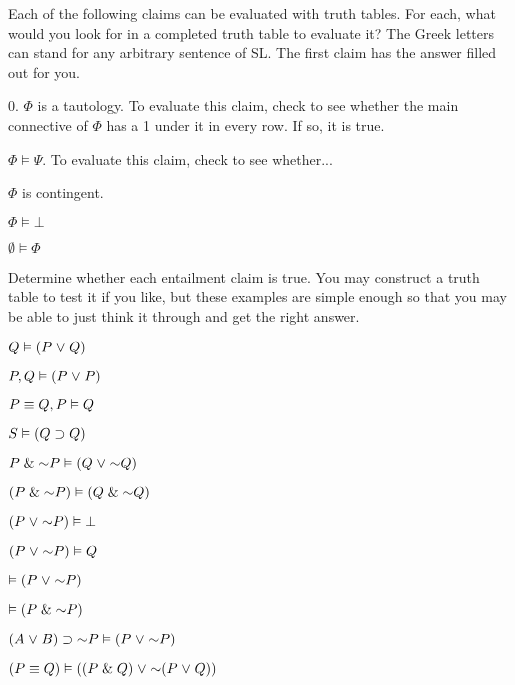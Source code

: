 




\problempart
\label{HW3.C}
Each of the following claims can be evaluated with truth tables. For each, what would you look for in a completed truth table to evaluate it? The Greek letters can stand for any arbitrary sentence of SL. The first claim has the answer filled out for you.

\begin{earg}
		\item[0.] $\Phi$ is a tautology.
		To evaluate this claim, check to see whether the main connective of $\Phi$ has a 1 under it in every row. If so, it is true.
		\item $\Phi \models \Psi$. 
		To evaluate this claim, check to see whether... 
		
		\item $\Phi$ is contingent.
\item $\Phi \models \bot$
		\item $\emptyset \models \Phi$
	\end{earg}


\problempart
Determine whether each entailment claim is true. You may construct a truth table to test it if you like, but these examples are simple enough so that you may be able to just think it through and get the right answer.
\begin{earg}
\item $Q \vDash (P \mkern1mu\vee\mkern1mu Q)$
\item $P, Q \vDash (P \mkern1mu\vee\mkern1mu P)$
\item $P \equiv Q, P \vDash Q$ %
\item $S \vDash (Q \supset Q)$   %
\item $P \eand \enot P \models (Q \eor \enot Q)$%
\item $(P \eand \enot P) \models (Q \eand \enot Q)$
\item $(P \eor \enot P) \models \bot$
\item $(P \eor \enot P) \models Q$%
\item $\models (P \eor \enot P)$
\item $\models (P \eand \enot P)$
\item $(A \eor B) \eif \enot P \models (P \eor \enot P)$
\item $(P \eiff Q) \models ((P \eand Q) \eor \enot (P \eor Q))$
\end{earg}

